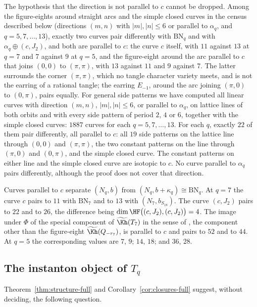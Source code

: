 \begin{remark}\label{rem:exceptional}
The hypothesis that the direction is not parallel to $c$ cannot be dropped.  Among the figure-eights around
straight arcs and the simple closed curves in the census described below (directions $(m,n)$ with $|m|,|n|\le6$
or parallel to $\alpha_q$, and $q=5,7,\dots,13$), exactly two curves pair differently
with $\mathrm{BN}_q$ and with $\alpha_q\oplus(c,J_2)$, and both are parallel to $c$: the curve $c$ itself, with $11$ against
$13$ at $q=7$ and $7$ against $9$ at $q=5$, and the figure-eight around the arc parallel to $c$ that
joins $(0,0)$ to $(\pi,\pi)$, with $13$ against $11$ and $9$ against $7$.  The latter surrounds the corner
$(\pi,\pi)$, which no tangle character variety meets, and is not the earring of a rational tangle;
the earring $E_{-1}$, around the arc joining $(\pi,0)$ to $(0,\pi)$, pairs equally.  For general side
patterns we have computed all linear curves with direction $(m,n)$, $|m|,|n|\le6$, or parallel to
$\alpha_q$, on lattice lines of both orbits and with every side pattern of period $2$, $4$ or $6$,
together with the simple closed curves: $1887$ curves for each $q=5,7,\dots,13$.  For each $q$,
exactly $22$ of them pair differently, all parallel to $c$: all $19$ side patterns on the lattice line
through $(0,0)$ and $(\pi,\pi)$, the two constant patterns on the line through $(\pi,0)$ and
$(0,\pi)$, and the simple closed curve.  The constant patterns on either line and the simple closed
curve are isotopic to $c$.  No curve parallel to
$\alpha_q$ pairs differently, although the proof does not cover that direction.
\end{remark}

\begin{remark}\label{rem:sharpness}
Curves parallel to $c$ separate $(N_q,b)$ from $(N_q,b+\kappa_q)\cong\mathrm{BN}_q$.  At $q=7$ the
curve $c$ pairs to $11$ with $\mathrm{BN}_7$ and to $13$ with $(N_7,b_{S_{18}})$.  The curve $(c,J_2)$
pairs to $22$ and to $26$, the difference being $\dim\HF\bigl((c,J_2),(c,J_2)\bigr)=4$.  The image
under $\Phi$ of the special component of $\widetilde{\Kh}(T_7)$ in the sense of \cite{KWZ}, the
component other than the figure-eight $\widetilde{\Kh}(Q_{-r_7})$, is parallel to $c$ and pairs to
$52$ and to $44$.  At $q=5$ the corresponding values are $7$, $9$; $14$, $18$; and $36$, $28$.
\end{remark}

\subsection{The instanton object of $T_q$}\label{ss:kh-question}
Theorem~\ref{thm:structure-full} and Corollary~\ref{cor:closures-full} suggest, without deciding, the
following question.

